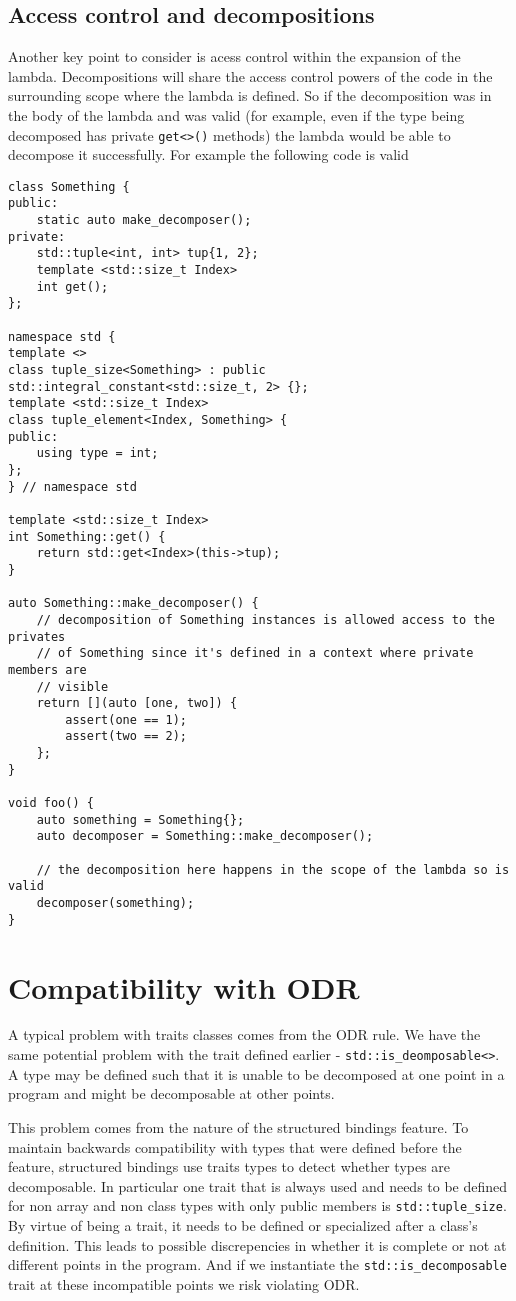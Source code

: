 \documentclass{article}
\begin{document}
\subsection{Access control and decompositions}
Another key point to consider is acess control within the expansion of the
lambda.  Decompositions will share the access control powers of the code in
the surrounding scope where the lambda is defined.  So if the decomposition
was in the body of the lambda and was valid (for example, even if the type
being decomposed has private \texttt{get<>()} methods)  the lambda would be
able to decompose it successfully.  For example the following code is valid

\begin{lstlisting}
class Something {
public:
    static auto make_decomposer();
private:
    std::tuple<int, int> tup{1, 2};
    template <std::size_t Index>
    int get();
};

namespace std {
template <>
class tuple_size<Something> : public std::integral_constant<std::size_t, 2> {};
template <std::size_t Index>
class tuple_element<Index, Something> {
public:
    using type = int;
};
} // namespace std

template <std::size_t Index>
int Something::get() {
    return std::get<Index>(this->tup);
}

auto Something::make_decomposer() {
    // decomposition of Something instances is allowed access to the privates
    // of Something since it's defined in a context where private members are
    // visible
    return [](auto [one, two]) {
        assert(one == 1);
        assert(two == 2);
    };
}

void foo() {
    auto something = Something{};
    auto decomposer = Something::make_decomposer();

    // the decomposition here happens in the scope of the lambda so is valid
    decomposer(something);
}
\end{lstlisting}


\section{Compatibility with ODR}
A typical problem with traits classes comes from the ODR rule.  We have the
same potential problem with the trait defined earlier -
\texttt{std::is\_deomposable<>}.  A type may be defined such that it is unable
to be decomposed at one point in a program and might be decomposable at other
points.

This problem comes from the nature of the structured bindings feature.  To
maintain backwards compatibility with types that were defined before the
feature, structured bindings use traits types to detect whether types are
decomposable.  In particular one trait that is always used and needs to be
defined for non array and non class types with only public members is
\texttt{std::tuple\_size}.  By virtue of being a trait, it needs to be defined
or specialized after a class's definition.  This leads to possible
discrepencies in whether it is complete or not at different points in the
program.  And if we instantiate the \texttt{std::is\_decomposable} trait at
these incompatible points we risk violating ODR.
\end{document}
